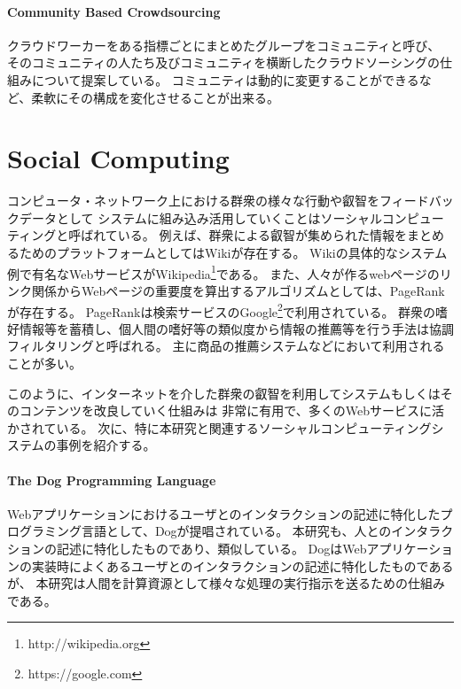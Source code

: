 \paragraph{Community Based
Crowdsourcing}\label{community-based-crowdsourcing}

\mbox{}

クラウドワーカーをある指標ごとにまとめたグループをコミュニティと呼び、
そのコミュニティの人たち及びコミュニティを横断したクラウドソーシングの仕組みについて提案している\cite{community-based-crowdsourcing}。
コミュニティは動的に変更することができるなど、柔軟にその構成を変化させることが出来る。

\section{Social Computing}\label{social-computing}

コンピュータ・ネットワーク上における群衆の様々な行動や叡智をフィードバックデータとして
システムに組み込み活用していくことはソーシャルコンピューティングと呼ばれている。
例えば、群衆による叡智が集められた情報をまとめるためのプラットフォームとしてはWiki\cite{wiki-way}が存在する。
Wikiの具体的なシステム例で有名なWebサービスがWikipedia\footnote{http://wikipedia.org}である。
また、人々が作るwebページのリンク関係からWebページの重要度を算出するアルゴリズムとしては、PageRank\cite{pagerank}が存在する。
PageRankは検索サービスのGoogle\footnote{https://google.com}で利用されている。
群衆の嗜好情報等を蓄積し、個人間の嗜好等の類似度から情報の推薦等を行う手法は協調フィルタリングと呼ばれる\cite{collaborative-filtering}。
主に商品の推薦システムなどにおいて利用されることが多い。

このように、インターネットを介した群衆の叡智を利用してシステムもしくはそのコンテンツを改良していく仕組みは
非常に有用で、多くのWebサービスに活かされている。
次に、特に本研究と関連するソーシャルコンピューティングシステムの事例を紹介する。

\paragraph{The Dog Programming
Language}\label{the-dog-programming-language}

\mbox{}

Webアプリケーションにおけるユーザとのインタラクションの記述に特化したプログラミング言語として、Dog\cite{dog}が提唱されている。
本研究も、人とのインタラクションの記述に特化したものであり、類似している。
DogはWebアプリケーションの実装時によくあるユーザとのインタラクションの記述に特化したものであるが、
本研究は人間を計算資源として様々な処理の実行指示を送るための仕組みである。

